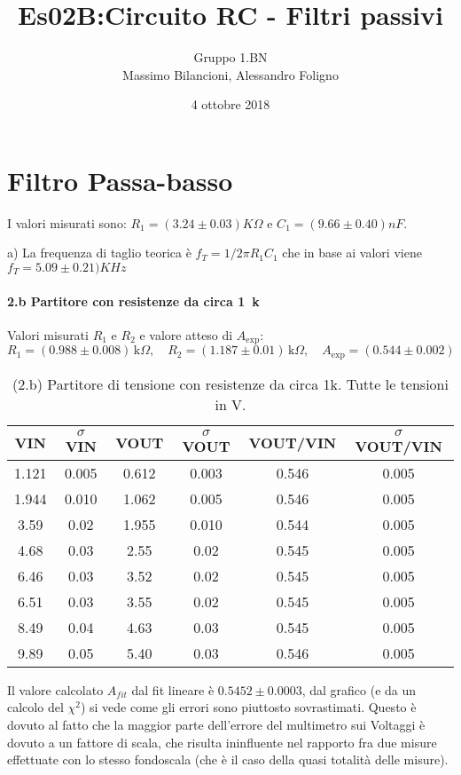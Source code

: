 \documentclass[10pt,a4paper]{article}
\author{Gruppo 1.BN \\ Massimo Bilancioni, Alessandro Foligno }
\title{Es02B:Circuito RC - Filtri passivi}
\begin{document}
\date{4 ottobre 2018}
\maketitle

\setcounter{section}{1}
\section{Filtro Passa-basso}
I valori misurati sono: $R_1  = (3.24\pm 0.03 )K\Omega$ e  $C_1  = (9.66\pm 0.40 )nF$.

a) La frequenza di taglio teorica è  $f_T = 1/2\pi R_1 C_1$ che in base ai valori viene $f_T = 5.09\pm 0.21)KHz$


\paragraph{2.b Partitore con resistenze da circa 1~k}
Valori misurati $R_1$ e $R_2$ e valore atteso di $A_\mathrm{exp}$:
\[
R_1 = (0.988  \pm0.008  ) \,\mathrm{k}\Omega, \quad
R_2 = (1.187 \pm 0.01 ) \,\mathrm{k}\Omega, \quad
A_\mathrm{exp} = ( 0.544 \pm 0.002 ) 
\]


\begin{table}[h]
\centering
\begin{tabular}{|c|c|c|c|c|c|}
\hline 
VIN& $\sigma$ VIN  &VOUT	 & $\sigma$ VOUT& VOUT/VIN & $\sigma$ VOUT/VIN \\
\hline 
1.121 & 0.005 & 0.612 & 0.003 & 0.546 & 0.005\\
1.944& 0.010 & 1.062& 0.005 & 0.546 & 0.005\\

3.59& 0.02 & 1.955 & 0.010 & 0.544 & 0.005\\

4.68 & 0.03 & 2.55 & 0.02 & 0.545 & 0.005\\
6.46 & 0.03 & 3.52 & 0.02 & 0.545& 0.005\\
6.51 & 0.03& 3.55 & 0.02& 0.545 & 0.005 \\
8.49 & 0.04 & 4.63& 0.03 & 0.545& 0.005\\
9.89 & 0.05 & 5.40 & 0.03 & 0.546 & 0.005\\


\hline 
\end{tabular} 
\caption{(2.b) Partitore di tensione con resistenze da circa 1k. Tutte le tensioni in V.\label{t:par1}}
\end{table}



Il valore calcolato $A_{fit}$ dal fit lineare è $ 0.5452\pm0.0003$, dal grafico (e da un  calcolo del $\chi^2$) si vede come gli errori sono piuttosto sovrastimati. Questo  è dovuto al fatto che la maggior parte dell'errore del multimetro sui Voltaggi è dovuto a un fattore di scala, che risulta ininfluente nel rapporto fra due misure effettuate con lo stesso fondoscala  (che è il caso della quasi totalità delle misure).
\end{document}
